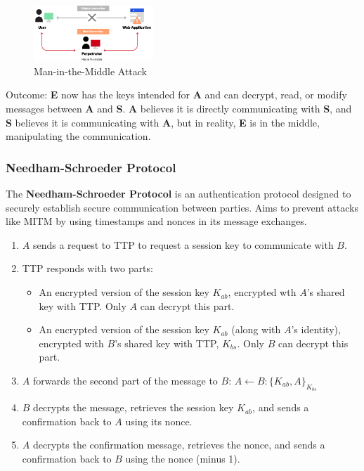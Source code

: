 \begin{figure}[h!]
    \centering
    \includegraphics[width=0.4\textwidth]{img/mitm.png}
    \caption{Man-in-the-Middle Attack}
\end{figure}

Outcome: \textbf{E} now has the keys intended for \textbf{A} and can decrypt, read, or modify messages between \textbf{A} and \textbf{S}. 
\textbf{A} believes it is directly communicating with \textbf{S}, and \textbf{S} believes it is communicating with \textbf{A}, but in reality, \textbf{E} is in the middle, manipulating the communication.

\subsubsection{Needham-Schroeder Protocol}
The \textbf{Needham-Schroeder Protocol} is an authentication protocol designed to securely establish
secure communication between parties. Aims to prevent attacks like MITM by using timestamps and nonces in its message exchanges. 

\begin{enumerate}
    \item $A$ sends a request to TTP to request a session key to communicate with $B$.
    \item TTP responds with two parts:
    \begin{itemize}
        \item An encrypted version of the session key $K_{ab}$, encrypted wth $A$'s shared key with TTP. Only $A$ can decrypt this part.
        \item An encrypted version of the session key $K_{ab}$ (along with $A$'s identity), encrypted with $B$'s shared key with TTP, $K_{bs}$. Only $B$ can decrypt this part.
    \end{itemize}

    \item $A$ forwards the second part of the message to $B$: $A \leftarrow B : \{K_{ab}, A\}_{K_{bs}}$
    \item $B$ decrypts the message, retrieves the session key $K_{ab}$, and sends a confirmation back to $A$ using its nonce.
    \item $A$ decrypts the confirmation message, retrieves the nonce, and sends a confirmation back to $B$ using the nonce (minus 1).
\end{enumerate}


